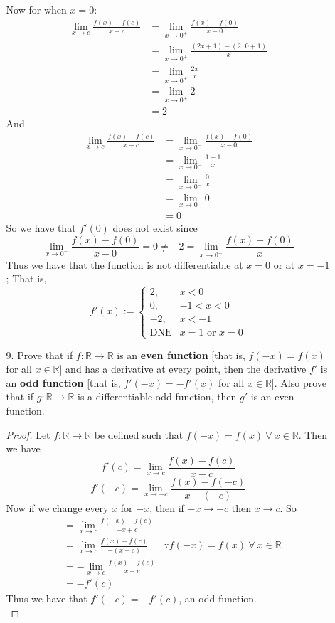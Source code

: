 \documentclass[12pt,letterpaper]{article}
\newcommand{\R}{\mathbb{R}}
\theoremstyle{case}
\theoremstyle{definition}
\begin{document}
\begin{enumerate}
\begin{enumerate}
			Now for when $x=0$:
			\begin{align*}
				\lim\limits_{x \to c} \frac{f(x)-f(c)}{x-c} &= \lim\limits_{x \to 0^+} \frac{f(x)-f(0)}{x-0} \\
				&= \lim\limits_{x \to 0^+} \frac{(2x+1)-(2 \cdot 0 +1)}{x} \\
				&= \lim\limits_{x \to 0^+} \frac{2x}{x} \\
				&= \lim\limits_{x \to 0^+} 2 \\
				&= 2
			\end{align*}
			And
			\begin{align*}
				\lim\limits_{x \to c} \frac{f(x)-f(c)}{x-c} &= \lim\limits_{x \to 0^-} \frac{f(x)-f(0)}{x-0} \\
				&= \lim\limits_{x \to 0^-} \frac{1-1}{x} \\
				&= \lim\limits_{x \to 0^-} \frac{0}{x} \\
				&= \lim\limits_{x \to 0^-} 0 \\
				&= 0
			\end{align*}
			So we have that $f'(0)$ does not exist since
			\[\lim\limits_{x \to 0^-} \frac{f(x)-f(0)}{x-0} = 0 \neq -2 = \lim\limits_{x \to 0^+} \frac{f(x)-f(0)}{x}\]
			Thus we have that the function is not differentiable at $x=0$ or at $x=-1$; That is,
			\[f'(x):=\begin{cases}
				2, & x < 0 \\
				0, & -1 < x < 0 \\
				-2, & x < -1 \\
				\text{DNE} & x=1 \text{ or } x=0
			\end{cases}\]
			\item[9.] Prove that if $f:\R \to \R$ is an \textbf{even function} [that is, $f(-x)=f(x)$ for all $x \in \R$] and has a derivative at every point, then the derivative $f'$ is an \textbf{odd function} [that is, $f'(-x)=-f'(x)$ for all $x \in \R$]. Also prove that if $g:\R \to \R$ is a differentiable odd function, then $g'$ is an even function.\\
			
			\begin{proof}
				Let $f:\R \to \R$ be defined such that $f(-x)=f(x)\ \forall\ x \in \R$. Then we have
				\[f'(c) = \lim\limits_{x \to c} \frac{f(x)-f(c)}{x-c}\]
				\[f'(-c) = \lim\limits_{x \to -c} \frac{f(x)-f(-c)}{x-(-c)}\]
				Now if we change every $x$ for $-x$, then if $-x \to -c$ then $x \to c$. So
				\begin{align*}
					&= \lim\limits_{x \to c} \frac{f(-x)-f(c)}{-x+c} \\
					&= \lim\limits_{x \to c} \frac{f(x)-f(c)}{-(x-c)} &\because f(-x)=f(x)\  \forall\ x \in \R \\
					&= -\lim\limits_{x \to c} \frac{f(x)-f(c)}{x-c} \\
					&= -f'(c)
				\end{align*}
				Thus we have that $f'(-c)=-f'(c)$, an odd function.\\
				

\end{proof}
\end{enumerate}
\end{enumerate}
\end{document}
